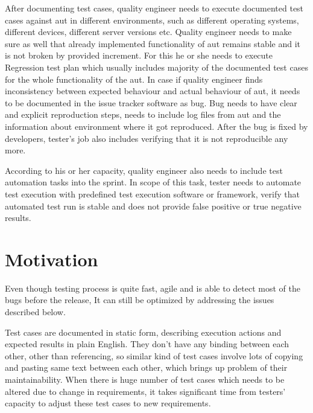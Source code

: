 \par
After documenting test cases, quality engineer needs to execute documented test cases against \acrlong{aut} in different environments, such as different operating systems, different devices, different server versions etc. Quality engineer needs to make sure as well that already implemented functionality of \acrlong{aut} remains stable and it is not broken by provided increment. For this he or she needs to execute Regression test plan which usually includes majority of the documented test cases for the whole functionality of the \acrlong{aut}. In case if quality engineer finds inconsistency between expected behaviour and actual behaviour of \acrlong{aut}, it needs to be documented in the issue tracker software as bug. Bug needs to have clear and explicit reproduction steps, needs to include log files from \acrlong{aut} and the information about environment where it got reproduced. After the bug is fixed by developers, tester's job also includes verifying that it is not reproducible any more.

\par
According to his or her capacity, quality engineer also needs to include test automation tasks into the sprint. In scope of this task, tester needs to automate test execution with predefined test execution software or framework, verify that automated test run is stable and does not provide false positive or true negative results.

\section{Motivation}

\par
Even though testing process is quite fast, agile and is able to detect most of the bugs before the release, It can still be optimized by addressing the issues described below.

\par
Test cases are documented in static form, describing execution actions and expected results in plain English. They don't have any binding between each other, other than referencing, so similar kind of test cases involve lots of copying and pasting same text between each other, which brings up problem of their maintainability. When there is huge number of test cases which needs to be altered due to change in requirements, it takes significant time from testers' capacity to adjust these test cases to new requirements.

